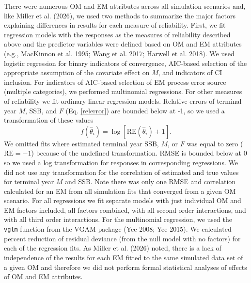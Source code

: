 \documentclass[
  12pt,
]{article}
\begin{document}
There were numerous OM and EM attributes across all simulation scenarios
and, like Miller et al. (2026), we used two methods to summarize the
major factors explaining differences in results for each measure of
reliability. First, we fit regression models with the responses as the
measures of reliability described above and the predictor variables were
defined based on OM and EM attributes (e.g., MacKinnon et al. 1995; Wang
et al. 2017; Harwell et al. 2018). We used logistic regression for
binary indicators of convergence, AIC-based selection of the appropriate
assumption of the covariate effect on \(M\), and indicators of CI
inclusion. For indicators of AIC-based selection of EM process error
source (multiple categories), we performed multinomial regressions. For
other measures of reliability we fit ordinary linear regression models.
Relative errors of terminal year \(M\), SSB, and \(F\) (Eq.
\ref{relerror}) are bounded below at -1, so we used a transformation of
these values \begin{equation}\label{relerror_trans_response}
f\left(\widehat \theta_i\right)  = \log\left[\text{RE}\left(\widehat \theta_i\right)+1\right].
\end{equation} We omitted fits where estimated terminal year SSB, \(M\),
or \(F\) was equal to zero (\(\text{RE} = -1\)) because of the undefined
transformation. RMSE is bounded below at 0 so we used a log
transformation for responses in corresponding regressions. We did not
use any transformation for the correlation of estimated and true values
for terminal year \(M\) and SSB. Note there was only one RMSE and
correlation calculated for an EM from all simulation fits that converged
from a given OM scenario. For all regressions we fit separate models
with just individual OM and EM factors included, all factors combined,
with all second order interactions, and with all third order
interactions. For the multinomial regression, we used the \verb|vglm|
function from the VGAM package (Yee 2008; Yee 2015). We calculated
percent reduction of residual deviance (from the null model with no
factors) for each of the regression fits. As Miller et al. (2026) noted,
there is a lack of independence of the results for each EM fitted to the
same simulated data set of a given OM and therefore we did not perform
formal statistical analyses of effects of OM and EM attributes.
\end{document}
